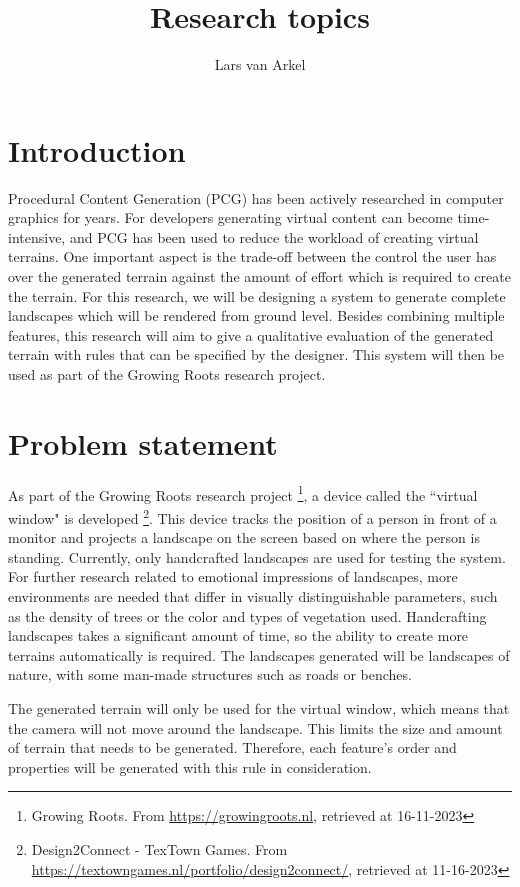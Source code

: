 \documentclass{article}
\title{Research topics}
\author{Lars van Arkel}
\begin{document}
 
\maketitle

\section{Introduction}
Procedural Content Generation (PCG) has been actively researched in computer graphics for years. For developers generating virtual content can become time-intensive, and PCG has been used to reduce the workload of creating virtual terrains. One important aspect is the trade-off between the control the user has over the generated terrain against the amount of effort which is required to create the terrain. For this research, we will be designing a system to generate complete landscapes which will be rendered from ground level. Besides combining multiple features, this research will aim to give a qualitative evaluation of the generated terrain with rules that can be specified by the designer. This system will then be used as part of the Growing Roots research project.

\section{Problem statement}
As part of the Growing Roots research project \footnote{Growing Roots. From \url{https://growingroots.nl}, retrieved at 16-11-2023}, a device called the ``virtual window" is developed \footnote{Design2Connect - TexTown Games. From \url{https://textowngames.nl/portfolio/design2connect/}, retrieved at 11-16-2023}. This device tracks the position of a person in front of a monitor and projects a landscape on the screen based on where the person is standing. Currently, only handcrafted landscapes are used for testing the system. For further research related to emotional impressions of landscapes, more environments are needed that differ in visually distinguishable parameters, such as the density of trees or the color and types of vegetation used. Handcrafting landscapes takes a significant amount of time, so the ability to create more terrains automatically is required. The landscapes generated will be landscapes of nature, with some man-made structures such as roads or benches. 

The generated terrain will only be used for the virtual window, which means that the camera will not move around the landscape. This limits the size and amount of terrain that needs to be generated. Therefore, each feature's order and properties will be generated with this rule in consideration.
\end{document}
